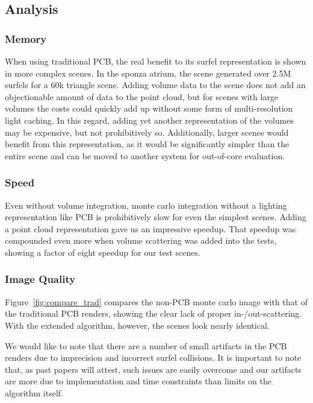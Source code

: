 \documentclass[runningheads]{llncs}
\begin{document}
\subsection{Analysis}

\subsubsection{Memory}
When using traditional PCB, the real benefit to its surfel representation is shown in more complex scenes.  In the sponza atrium, the scene generated over 2.5M surfels for a 60k triangle scene.  Adding volume data to the scene does not add an objectionable amount of data to the point cloud, but for scenes with large volumes the costs could quickly add up without some form of multi-resolution light caching.  In this regard, adding yet another representation of the volumes may be expensive, but not prohibitively so.  Additionally, larger scenes would benefit from this representation, as it would be significantly simpler than the entire scene and can be moved to another system for out-of-core evaluation.

\subsubsection{Speed}
Even without volume integration, monte carlo integration without a lighting representation like PCB is prohibitively slow for even the simplest scenes.  Adding a point cloud representation gave us an impressive speedup.  That speedup was compounded even more when volume scattering was added into the tests, showing a factor of eight speedup for our test scenes.

\subsubsection*{Image Quality}
Figure~\ref{fig:compare_trad} compares the non-PCB monte carlo image with that of the traditional PCB renders, showing the clear lack of proper in-/out-scattering.  With the extended algorithm, however, the scenes look nearly identical.

We would like to note that there are a number of small artifacts in the PCB renders due to imprecision and incorrect surfel collisions.  It is important to note that, as past papers will attest, such issues are easily overcome and our artifacts are more due to implementation and time constraints than limits on the algorithm itself.
\end{document}
